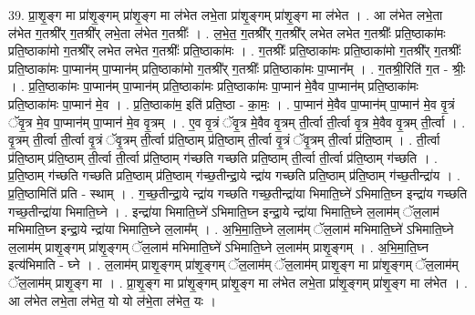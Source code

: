 \documentclass[17pt]{extarticle}
\begin{document}
39. प्रा॒शृ॒ङ्ग मा प्रा॑शृ॒ङ्गम् प्रा॑शृ॒ङ्ग मा ल॑भेत लभे॒ता प्रा॑शृ॒ङ्गम् प्रा॑शृ॒ङ्ग मा ल॑भेत । . आ ल॑भेत लभे॒ता ल॑भेत ग॒तश्री᳚र् ग॒तश्री᳚र् लभे॒ता ल॑भेत ग॒तश्रीः᳚ । . ल॒भे॒त॒ ग॒तश्री᳚र् ग॒तश्री᳚र् लभेत लभेत ग॒तश्रीः᳚ प्रति॒ष्ठाका॑मः प्रति॒ष्ठाका॑मो ग॒तश्री᳚र् लभेत लभेत ग॒तश्रीः᳚ प्रति॒ष्ठाका॑मः । . ग॒तश्रीः᳚ प्रति॒ष्ठाका॑मः प्रति॒ष्ठाका॑मो ग॒तश्री᳚र् ग॒तश्रीः᳚ प्रति॒ष्ठाका॑मः पा॒प्मान॑म् पा॒प्मान॑म् प्रति॒ष्ठाका॑मो ग॒तश्री᳚र् ग॒तश्रीः᳚ प्रति॒ष्ठाका॑मः पा॒प्मान᳚म् । . ग॒तश्री॒रिति॑ ग॒त - श्रीः॒ । . प्र॒ति॒ष्ठाका॑मः पा॒प्मान॑म् पा॒प्मान॑म् प्रति॒ष्ठाका॑मः प्रति॒ष्ठाका॑मः पा॒प्मान॑ मे॒वैव पा॒प्मान॑म् प्रति॒ष्ठाका॑मः प्रति॒ष्ठाका॑मः पा॒प्मान॑ मे॒व । . प्र॒ति॒ष्ठाका॑म॒ इति॑ प्रति॒ष्ठा - का॒मः॒ । . पा॒प्मान॑ मे॒वैव पा॒प्मान॑म् पा॒प्मान॑ मे॒व वृ॒त्रं ॅवृ॒त्र मे॒व पा॒प्मान॑म् पा॒प्मान॑ मे॒व वृ॒त्रम् । . ए॒व वृ॒त्रं ॅवृ॒त्र मे॒वैव वृ॒त्रम् ती॒र्त्वा ती॒र्त्वा वृ॒त्र मे॒वैव वृ॒त्रम् ती॒र्त्वा । . वृ॒त्रम् ती॒र्त्वा ती॒र्त्वा वृ॒त्रं ॅवृ॒त्रम् ती॒र्त्वा प्र॑ति॒ष्ठाम् प्र॑ति॒ष्ठाम् ती॒र्त्वा वृ॒त्रं ॅवृ॒त्रम् ती॒र्त्वा प्र॑ति॒ष्ठाम् । . ती॒र्त्वा प्र॑ति॒ष्ठाम् प्र॑ति॒ष्ठाम् ती॒र्त्वा ती॒र्त्वा प्र॑ति॒ष्ठाम् ग॑च्छति गच्छति प्रति॒ष्ठाम् ती॒र्त्वा ती॒र्त्वा प्र॑ति॒ष्ठाम् ग॑च्छति । . प्र॒ति॒ष्ठाम् ग॑च्छति गच्छति प्रति॒ष्ठाम् प्र॑ति॒ष्ठाम् ग॑च्छ॒तीन्द्रा॒ये न्द्रा॑य गच्छति प्रति॒ष्ठाम् प्र॑ति॒ष्ठाम् ग॑च्छ॒तीन्द्रा॑य । . प्र॒ति॒ष्ठामिति॑ प्रति - स्थाम् । . ग॒च्छ॒तीन्द्रा॒ये न्द्रा॑य गच्छति गच्छ॒तीन्द्रा॑या भिमाति॒घ्ने॑ ऽभिमाति॒घ्न इन्द्रा॑य गच्छति गच्छ॒तीन्द्रा॑या भिमाति॒घ्ने । . इन्द्रा॑या भिमाति॒घ्ने॑ ऽभिमाति॒घ्न इन्द्रा॒ये न्द्रा॑या भिमाति॒घ्ने ल॒लाम॑म् ॅल॒लाम॑ मभिमाति॒घ्न इन्द्रा॒ये न्द्रा॑या भिमाति॒घ्ने ल॒लाम᳚म् । . अ॒भि॒मा॒ति॒घ्ने ल॒लाम॑म् ॅल॒लाम॑ मभिमाति॒घ्ने॑ ऽभिमाति॒घ्ने ल॒लाम॑म् प्राशृ॒ङ्गम् प्रा॑शृ॒ङ्गम् ॅल॒लाम॑ मभिमाति॒घ्ने॑ ऽभिमाति॒घ्ने ल॒लाम॑म् प्राशृ॒ङ्गम् । . अ॒भि॒मा॒ति॒घ्न इत्य॑भिमाति - घ्ने । . ल॒लाम॑म् प्राशृ॒ङ्गम् प्रा॑शृ॒ङ्गम् ॅल॒लाम॑म् ॅल॒लाम॑म् प्राशृ॒ङ्ग मा प्रा॑शृ॒ङ्गम् ॅल॒लाम॑म् ॅल॒लाम॑म् प्राशृ॒ङ्ग मा । . प्रा॒शृ॒ङ्ग मा प्रा॑शृ॒ङ्गम् प्रा॑शृ॒ङ्ग मा ल॑भेत लभे॒ता प्रा॑शृ॒ङ्गम् प्रा॑शृ॒ङ्ग मा ल॑भेत । . आ ल॑भेत लभे॒ता ल॑भेत॒ यो यो ल॑भे॒ता ल॑भेत॒ यः । \newline
\pagebreak
{}
\end{document}
